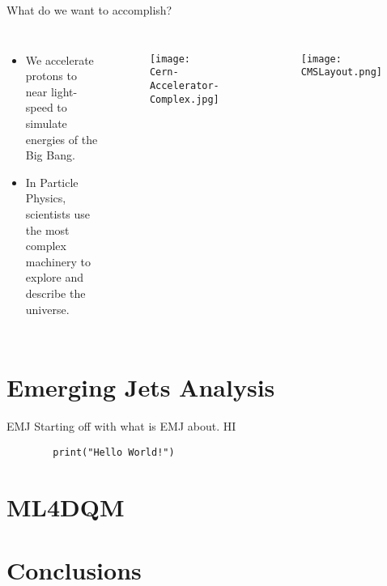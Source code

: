 \documentclass[8pt,aspectratio=169]{beamer}
\begin{document}
\begin{frame}{What do we want to accomplish?}
	\begin{columns}
		\begin{itemize}
			\item We accelerate protons to near light-speed to simulate energies of the Big Bang.
			\item In Particle Physics, scientists use the most complex machinery to explore and describe the universe.
		\end{itemize}
		\begin{figure}
			\centering
			\texttt{[image: Cern-Accelerator-Complex.jpg]}
		\end{figure}
		\begin{figure}
			\centering
			\texttt{[image: CMSLayout.png]}
		\end{figure}
	\end{columns}
\end{frame}
\section{Emerging Jets Analysis}

\begin{frame}[fragile]{EMJ}
	Starting off with what is EMJ about.
	HI
	\begin{verbatim}
        print("Hello World!")
    \end{verbatim}
\end{frame}

\section{ML4DQM}


\section{Conclusions}
\end{document}
